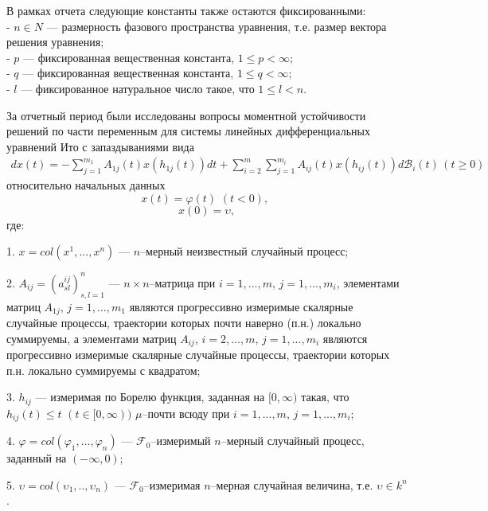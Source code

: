 В рамках отчета следующие константы также остаются фиксированными:\\
- $n \in N$ --- размерность фазового пространства уравнения, т.е. размер вектора решения уравнения;\\
- $p$ --- фиксированная вещественная константа, $1 \le  p < \infty $;\\
- $q$ --- фиксированная вещественная константа, $1 \le  q < \infty $;\\
- $l$ --- фиксированное натуральное число такое, что $1 \le  l < n$.

За отчетный период были исследованы вопросы моментной устойчивости
решений по части переменным для системы линейных дифференциальных
уравнений Ито с запаздываниями вида
\begin{equation}
\label{eq:kri-1}
\begin{array}{crl}
dx(t) = - \sum \limits_{j=1}^{m_1}A_{1j}(t)x(h_{1j}(t))dt + \sum
\limits_{i=2}^m\sum
\limits_{j=1}^{m_i}A_{ij}(t)x(h_{ij}(t))d\mathcal B_i(t) \, (t \ge
0)
\end{array}
\end{equation}
относительно начальных данных
\begin{equation}
\label{eq:kri-1a}
x(t) = \varphi(t) {\,\,} (t <0), {\,\,}   
\end{equation}
\begin{equation}
\label{eq:kri-1b}
x(0) = \upsilon,  
\end{equation}
где:

1. $x = col(x^1,...,x^n)$ --- $n$--мерный неизвестный случайный
процесс;

2.  $A_{ij} = (a^{ij}_{sl})^n_{s,l=1}$ --- $n \times n$--матрица при
$i = 1,...,m$, $j = 1,...,m_i$, элементами матриц $A_{1j}$, $j =
1,...,m_1$ являются прогрессивно измеримые скалярные случайные
процессы, траектории которых почти наверно (п.н.) локально
суммируемы, а элементами матриц $A_{ij}$, $i = 2,...,m$, $j =
1,...,m_i$ являются прогрессивно измеримые скалярные случайные
процессы, траектории которых п.н. локально суммируемы с квадратом;

3.  $ h_{ij}$ --- измеримая по Борелю функция, заданная на $[0,
\infty)$ такая, что $ h_{ij}(t)\leq t {\,} {\,} (t \in [0, \infty))$
$\mu $--почти всюду при $i = 1,...,m$, $j = 1,...,m_i$;

4.  $\varphi = col (\varphi _1,..., \varphi _n)$ --- ${\mathcal
F}_0$--измеримый $n$--мерный случайный процесс, заданный на
$(-\infty , 0)$;

5.  $\upsilon = col (\upsilon_1,.., \upsilon_n)$ --- ${\mathcal
F}_0$--измеримая $n$--мерная случайная величина, т.е. $\upsilon \in
k^n$.

